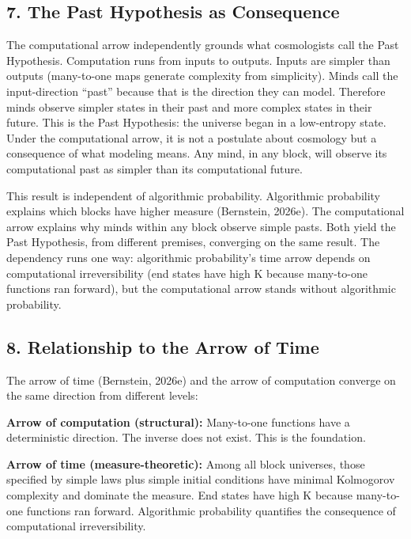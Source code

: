 \documentclass[
]{article}
\begin{document}
\subsection{7. The Past Hypothesis as
Consequence}\label{the-past-hypothesis-as-consequence}

The computational arrow independently grounds what cosmologists call the
Past Hypothesis. Computation runs from inputs to outputs. Inputs are
simpler than outputs (many-to-one maps generate complexity from
simplicity). Minds call the input-direction ``past'' because that is the
direction they can model. Therefore minds observe simpler states in
their past and more complex states in their future. This is the Past
Hypothesis: the universe began in a low-entropy state. Under the
computational arrow, it is not a postulate about cosmology but a
consequence of what modeling means. Any mind, in any block, will observe
its computational past as simpler than its computational future.

This result is independent of algorithmic probability. Algorithmic
probability explains which blocks have higher measure (Bernstein,
2026e). The computational arrow explains why minds within any block
observe simple pasts. Both yield the Past Hypothesis, from different
premises, converging on the same result. The dependency runs one way:
algorithmic probability's time arrow depends on computational
irreversibility (end states have high K because many-to-one functions
ran forward), but the computational arrow stands without algorithmic
probability.

\subsection{8. Relationship to the Arrow of
Time}\label{relationship-to-the-arrow-of-time}

The arrow of time (Bernstein, 2026e) and the arrow of computation
converge on the same direction from different levels:

\textbf{Arrow of computation (structural):} Many-to-one functions have a
deterministic direction. The inverse does not exist. This is the
foundation.

\textbf{Arrow of time (measure-theoretic):} Among all block universes,
those specified by simple laws plus simple initial conditions have
minimal Kolmogorov complexity and dominate the measure. End states have
high K because many-to-one functions ran forward. Algorithmic
probability quantifies the consequence of computational irreversibility.
\end{document}
